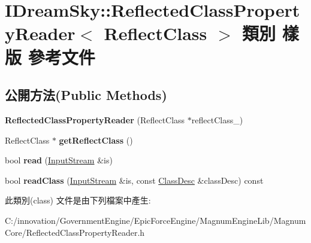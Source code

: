 \hypertarget{class_i_dream_sky_1_1_reflected_class_property_reader}{}\section{I\+Dream\+Sky\+:\+:Reflected\+Class\+Property\+Reader$<$ Reflect\+Class $>$ 類別 樣版 參考文件}
\label{class_i_dream_sky_1_1_reflected_class_property_reader}
\subsection*{公開方法(Public Methods)}
\begin{DoxyCompactItemize}
\item 
{\bfseries Reflected\+Class\+Property\+Reader} (Reflect\+Class $\ast$reflect\+Class\+\_\+)\hypertarget{class_i_dream_sky_1_1_reflected_class_property_reader_ad85d893d30497c5a525ef0857a160d9d}{}\label{class_i_dream_sky_1_1_reflected_class_property_reader_ad85d893d30497c5a525ef0857a160d9d}

\item 
Reflect\+Class $\ast$ {\bfseries get\+Reflect\+Class} ()\hypertarget{class_i_dream_sky_1_1_reflected_class_property_reader_acf960ee3b8ce6827dec09b5d27c196b6}{}\label{class_i_dream_sky_1_1_reflected_class_property_reader_acf960ee3b8ce6827dec09b5d27c196b6}

\item 
bool {\bfseries read} (\hyperlink{class_i_dream_sky_1_1_input_stream}{Input\+Stream} \&is)\hypertarget{class_i_dream_sky_1_1_reflected_class_property_reader_a9d821120c0a62b65313e72b43c9bdfed}{}\label{class_i_dream_sky_1_1_reflected_class_property_reader_a9d821120c0a62b65313e72b43c9bdfed}

\item 
bool {\bfseries read\+Class} (\hyperlink{class_i_dream_sky_1_1_input_stream}{Input\+Stream} \&is, const \hyperlink{classagm_1_1reflection_1_1_class_desc}{Class\+Desc} \&class\+Desc) const \hypertarget{class_i_dream_sky_1_1_reflected_class_property_reader_aaea1bcec8214f388998ab7141557796c}{}\label{class_i_dream_sky_1_1_reflected_class_property_reader_aaea1bcec8214f388998ab7141557796c}

\end{DoxyCompactItemize}


此類別(class) 文件是由下列檔案中產生\+:\begin{DoxyCompactItemize}
\item 
C\+:/innovation/\+Government\+Engine/\+Epic\+Force\+Engine/\+Magnum\+Engine\+Lib/\+Magnum\+Core/Reflected\+Class\+Property\+Reader.\+h\end{DoxyCompactItemize}
